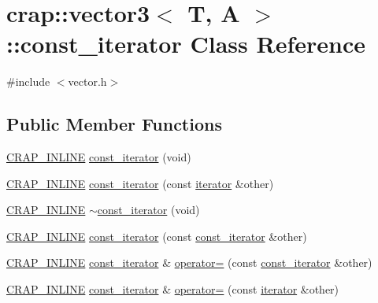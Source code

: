 \hypertarget{classcrap_1_1vector3_1_1const__iterator}{\section{crap\+:\+:vector3$<$ T, A $>$\+:\+:const\+\_\+iterator Class Reference}
\label{classcrap_1_1vector3_1_1const__iterator}
}


{\ttfamily \#include $<$vector.\+h$>$}

\subsection*{Public Member Functions}
\begin{DoxyCompactItemize}
\item 
\hyperlink{config__x86_8h_a5a40526b8d842e7ff731509998bb0f1c}{C\+R\+A\+P\+\_\+\+I\+N\+L\+I\+N\+E} \hyperlink{classcrap_1_1vector3_1_1const__iterator_aafc32fedd071afc2f1eedec82645e69c}{const\+\_\+iterator} (void)
\item 
\hyperlink{config__x86_8h_a5a40526b8d842e7ff731509998bb0f1c}{C\+R\+A\+P\+\_\+\+I\+N\+L\+I\+N\+E} \hyperlink{classcrap_1_1vector3_1_1const__iterator_acbc7d9c18770635f2f5bbef893580866}{const\+\_\+iterator} (const \hyperlink{classcrap_1_1vector3_1_1iterator}{iterator} \&other)
\item 
\hyperlink{config__x86_8h_a5a40526b8d842e7ff731509998bb0f1c}{C\+R\+A\+P\+\_\+\+I\+N\+L\+I\+N\+E} \hyperlink{classcrap_1_1vector3_1_1const__iterator_aea532a9e7989dd1718ed16342451a564}{$\sim$const\+\_\+iterator} (void)
\item 
\hyperlink{config__x86_8h_a5a40526b8d842e7ff731509998bb0f1c}{C\+R\+A\+P\+\_\+\+I\+N\+L\+I\+N\+E} \hyperlink{classcrap_1_1vector3_1_1const__iterator_a7e5d89ec6f50e218e7644172d86535cb}{const\+\_\+iterator} (const \hyperlink{classcrap_1_1vector3_1_1const__iterator}{const\+\_\+iterator} \&other)
\item 
\hyperlink{config__x86_8h_a5a40526b8d842e7ff731509998bb0f1c}{C\+R\+A\+P\+\_\+\+I\+N\+L\+I\+N\+E} \hyperlink{classcrap_1_1vector3_1_1const__iterator}{const\+\_\+iterator} \& \hyperlink{classcrap_1_1vector3_1_1const__iterator_a9a6740f3bcd0fc68904c6294c90c8921}{operator=} (const \hyperlink{classcrap_1_1vector3_1_1const__iterator}{const\+\_\+iterator} \&other)
\item 
\hyperlink{config__x86_8h_a5a40526b8d842e7ff731509998bb0f1c}{C\+R\+A\+P\+\_\+\+I\+N\+L\+I\+N\+E} \hyperlink{classcrap_1_1vector3_1_1const__iterator}{const\+\_\+iterator} \& \hyperlink{classcrap_1_1vector3_1_1const__iterator_a95b6c6041313ab81e92032dfdd2d75d6}{operator=} (const \hyperlink{classcrap_1_1vector3_1_1iterator}{iterator} \&other)

\end{DoxyCompactItemize}
